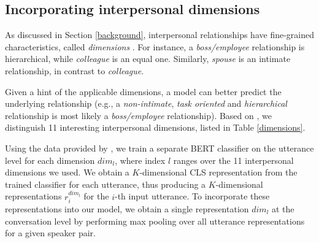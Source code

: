 \subsection{Incorporating interpersonal dimensions}

As discussed in Section \ref{background}, interpersonal relationships have fine-grained characteristics, called \textit{dimensions} \cite{wish1976perceived}. For instance, a \textit{boss/employee} relationship is hierarchical, while \textit{colleague} is an equal one. Similarly, \textit{spouse} is an intimate relationship, in contrast to \textit{colleague}.

Given a hint of the applicable dimensions, a model can better predict the underlying relationship (e.g., a \textit{non-intimate}, \textit{task oriented} and \textit{hierarchical} relationship is most likely a \textit{boss/employee} relationship). Based on \citet{rashid2018characterizing}, we distinguish 11 interesting interpersonal dimensions, listed in Table \ref{dimensions}. 

Using the data provided by \citeauthor{rashid2018characterizing}, we train a separate BERT classifier on the utterance level for each dimension $dim_l$, where index $l$ ranges over the 11 interpersonal dimensions we used.
We obtain a $K$-dimensional CLS representation from the trained classifier for each utterance, thus producing a $K$-dimensional representations $r^{dim_l}_i$ for the $i$-th input utterance.
To incorporate these representations into our model, we obtain a single representation $dim_l$ at the conversation level by performing max pooling over all utterance representations for a given speaker pair.

